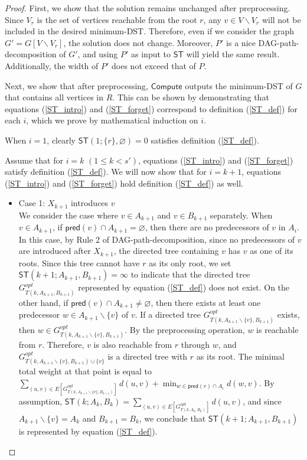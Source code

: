 \documentclass[runningheads]{llncs}
\theoremstyle{plain}
\theoremstyle{definition}
\begin{document}
\begin{proof}
    First, we show that the solution remains unchanged after preprocessing. Since $V_r$ is the set of vertices reachable from the root $r$, any $v \in V \backslash V_r$ will not be included in the desired minimum-DST. Therefore, even if we consider the graph $G' = G[V \backslash V_r]$, the solution does not change. Moreover, $P'$ is a nice DAG-path-decomposition of $G'$, and using $P'$ as input to $\mathsf{ST}$ will yield the same result. Additionally, the width of $P'$ does not exceed that of $P$.

    Next, we show that after preprocessing, $\mathsf{Compute}$ outputs the minimum-DST of $G$ that contains all vertices in $R$. This can be shown by demonstrating that equations (\ref{ST_intro}) and (\ref{ST_forget}) correspond to definition (\ref{ST_def}) for each $i$, which we prove by mathematical induction on $i$.
    
    When $i=1$, clearly $\mathsf{ST}(1; \{r\}, \varnothing) = 0$ satisfies definition (\ref{ST_def}).
    
    Assume that for $i=k$ $(1 \leq k < s')$, equations (\ref{ST_intro}) and (\ref{ST_forget}) satisfy definition (\ref{ST_def}). We will now show that for $i=k+1$, equations (\ref{ST_intro}) and (\ref{ST_forget}) hold definition (\ref{ST_def}) as well.

    \begin{itemize}
    \item Case 1: $X_{k+1}$ introduces $v$\\
    We consider the case where $v \in A_{k+1}$ and $v \in B_{k+1}$ separately. 
    When $v \in A_{k+1}$, if $\mathsf{pred}(v) \cap A_{k+1} = \varnothing$, then there are no predecessors of $v$ in $A_i$. In this case, by Rule 2 of DAG-path-decomposition, since no predecessors of $v$ are introduced after $X_{k+1}$, the directed tree containing $v$ has $v$ as one of its roots. Since this tree cannot have $r$ as its only root, we set $\mathsf{ST}(k+1; A_{k+1}, B_{k+1}) = \infty$ to indicate that the directed tree $G^{opt}_{T(k, A_{k+1}, B_{k+1})}$ represented by equation (\ref{ST_def}) does not exist. On the other hand, if $\mathsf{pred}(v) \cap A_{k+1} \neq \varnothing$, then there exists at least one predecessor $w \in A_{k+1} \backslash \{v\}$ of $v$. If a directed tree $G^{opt}_{T(k, A_{k+1} \backslash \{v\}, B_{k+1})}$ exists, then $w \in G^{opt}_{T(k, A_{k+1} \backslash \{v\}, B_{k+1})}$. By the preprocessing operation, $w$ is reachable from $r$. Therefore, $v$ is also reachable from $r$ through $w$, and $G^{opt}_{T(k, A_{k+1} \backslash \{v\}, B_{k+1}) \cup \{v\}}$ is a directed tree with $r$ as its root. The minimal total weight at that point is equal to $ \sum_{(u, v) \in E[G^{opt}_{T(k, A_{k+1} \backslash \{v\}, B_{k+1})}]} d(u, v) + \min_{w \in \mathsf{pred}(v) \cap A_i} d(w, v)$. By assumption, $\mathsf{ST}(k; A_k, B_k) = \sum_{(u, v) \in E[G^{opt}_{T(k, A_k, B_k)}]} d(u, v)$, and since $A_{k+1} \backslash \{v\} = A_k$ and $B_{k+1} = B_k$, we conclude that $\mathsf{ST}(k+1; A_{k+1}, B_{k+1})$ is represented by equation (\ref{ST_def}).


\end{itemize}
\end{proof}
\end{document}
